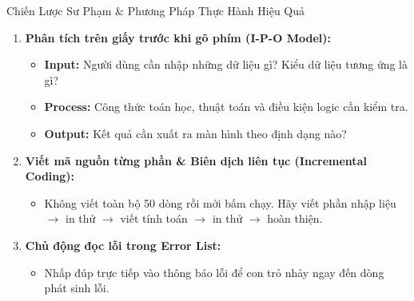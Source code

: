 \documentclass[aspectratio=169, 10pt]{beamer}
\begin{document}
\begin{frame}{Chiến Lược Sư Phạm \& Phương Pháp Thực Hành Hiệu Quả}
  \begin{tcolorbox}[colback=UniLightBlue!30,colframe=UniNavy,title=\textbf{Quy Trình 3 Bước Tiếp Cận Mọi Bài Toán Lập Trình}]
    \begin{enumerate}
      \item \textbf{Phân tích trên giấy trước khi gõ phím (I-P-O Model):}
        \begin{itemize}
          \item \textbf{Input:} Người dùng cần nhập những dữ liệu gì? Kiểu dữ liệu tương ứng là gì?
          \item \textbf{Process:} Công thức toán học, thuật toán và điều kiện logic cần kiểm tra.
          \item \textbf{Output:} Kết quả cần xuất ra màn hình theo định dạng nào?
        \end{itemize}
      \item \textbf{Viết mã nguồn từng phần \& Biên dịch liên tục (Incremental Coding):}
        \begin{itemize}
          \item Không viết toàn bộ 50 dòng rồi mới bấm chạy. Hãy viết phần nhập liệu $\to$ in thử $\to$ viết tính toán $\to$ in thử $\to$ hoàn thiện.
        \end{itemize}
      \item \textbf{Chủ động đọc lỗi trong Error List:}
        \begin{itemize}
          \item Nhấp đúp trực tiếp vào thông báo lỗi để con trỏ nhảy ngay đến dòng phát sinh lỗi.
        \end{itemize}
    \end{enumerate}
  \end{tcolorbox}
\end{frame}
\end{document}
